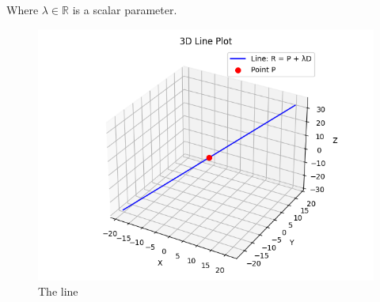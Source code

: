 \documentclass[journal]{IEEEtran}
\begin{document}
Where \(\lambda \in \mathbb{R}\) is a scalar parameter.


\begin{figure}[h!t]
    \centering
    \includegraphics[width=1\linewidth]{figs/fig1}
    \caption{The line}
    \label{fig:fig1}
\end{figure}
\end{document}
